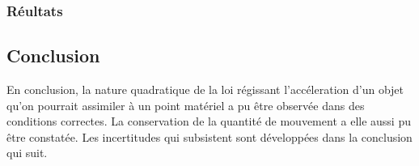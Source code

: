 \subsubsection{Réultats}


\subsection{Conclusion}
En conclusion, la nature quadratique de la loi régissant l'accéleration d'un objet qu'on pourrait assimiler à un point matériel a pu être observée dans des conditions correctes.
La conservation de la quantité de mouvement a elle aussi pu être constatée. Les incertitudes qui subsistent sont développées dans la conclusion qui suit.